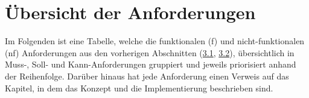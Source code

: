 \section{Übersicht der Anforderungen}
\label{chapter:3-section:uebersicht-anforderungen}

Im Folgenden ist eine Tabelle, welche die funktionalen (f) und nicht-funktionalen (nf) Anforderungen aus den vorherigen Abschnitten (\hyperref[chapter:3-section:funktionale-anforderungen]{3.1}, \hyperref[chapter:3-section:nichtfunktionale-anforderungen]{3.2}), übersichtlich in Muss-, Soll- und Kann-Anforderungen gruppiert und jeweils priorisiert anhand der Reihenfolge.
Darüber hinaus hat jede Anforderung einen Verweis auf das Kapitel, in dem das Konzept und die Implementierung beschrieben sind.


